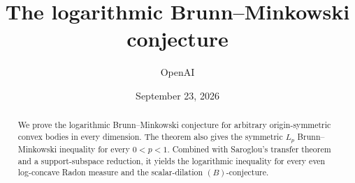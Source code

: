 \documentclass[11pt]{article}
\title{The logarithmic Brunn--Minkowski conjecture}
\author{OpenAI}
\date{September 23, 2026}
\theoremstyle{remark}
\numberwithin{equation}{section}
\begin{document}
\maketitle
\begin{abstract}
We prove the logarithmic Brunn--Minkowski conjecture for arbitrary
origin-symmetric convex bodies in every dimension. The theorem also gives
the symmetric $L_p$ Brunn--Minkowski inequality for every $0<p<1$.
Combined with Saroglou's transfer theorem and a support-subspace reduction,
it yields the logarithmic inequality for every even log-concave Radon
measure and the scalar-dilation $(B)$-conjecture.
\end{abstract}
\tableofcontents












\end{document}
